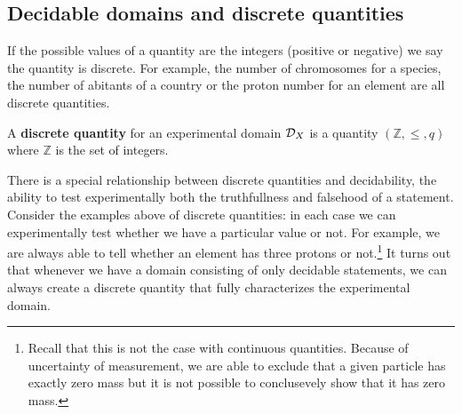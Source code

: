 \documentclass[11pt,letterpaper,fleqn]{memoir} %
\begin{document}
\subsection{Decidable domains and discrete quantities}

If the possible values of a quantity are the integers (positive or negative) we say the quantity is discrete. For example, the number of chromosomes for a species, the number of abitants of a country or the proton number for an element are all discrete quantities.

\begin{mathSection}
\begin{defn}
	A \textbf{discrete quantity} for an experimental domain $\mathcal{D}_X$ is a quantity $(\mathbb{Z}, \leq, q)$ where $\mathbb{Z}$ is the set of integers.
\end{defn}
\end{mathSection}

There is a special relationship between discrete quantities and decidability, the ability to test experimentally both the truthfullness and falsehood of a statement. Consider the examples above of discrete quantities: in each case we can experimentally test whether we have a particular value or not. For example, we are always able to tell whether an element has three protons or not.\footnote{Recall that this is not the case with continuous quantities. Because of uncertainty of measurement, we are able to exclude that a given particle has exactly zero mass but it is not possible to conclusevely show that it has zero mass.} It turns out that whenever we have a domain consisting of only decidable statements, we can always create a discrete quantity that fully characterizes the experimental domain.
\end{document}
